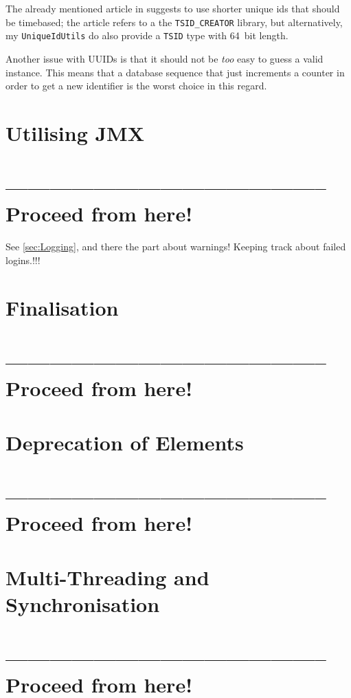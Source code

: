 \documentclass[11pt,a4paper, titlepage, parskip=half, headsepline, footsepline, cleardoublepage=current, headheight=1cm]{scrbook}
\begin{document}
The already mentioned article in \autocite{Mihalcea:UUID_Database_Primary_Key} suggests to use shorter unique ids that should be timebased; the article refers to a the \verb#TSID_CREATOR# library\autocite{Lima:TSID_CREATOR}, but alternatively, my \lstinline|UniqueIdUtils| do also provide a \lstinline|TSID| type with 64~bit length.

Another issue with UUIDs is that it should not be \textit{too} easy to guess a valid instance. This means that a database sequence\autocite{TOAD_WORLD_BLOG:DatabaseSequence} that just increments a counter in order to get a new identifier is the worst choice in this regard.

\section{Utilising JMX}\label{sec:UtilisingJMX}
\section{-------------------------------------------- Proceed from here!}
See \ref{sec:Logging}, and there the part about warnings! Keeping track about failed logins.!!!
\lipsum[1]


\section{Finalisation}\label{sec:Finalisation}
\section{-------------------------------------------- Proceed from here!}
\lipsum[1]

\section{Deprecation of Elements}\label{sec:DeprecationOfElements}
\section{-------------------------------------------- Proceed from here!}
\lipsum[1]

\section{Multi-Threading and Synchronisation}\label{sec:MultiThreading}
\section{-------------------------------------------- Proceed from here!}
\lipsum[1]
\end{document}
